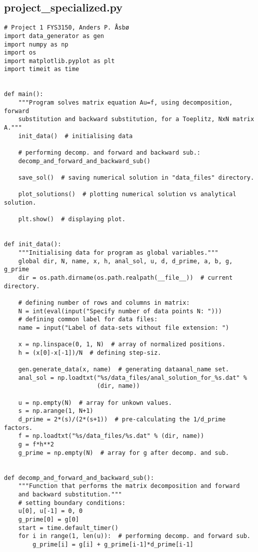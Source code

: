 \documentclass[english,notitlepage]{revtex4-1}  %
\begin{document}
\subsection{project\_specialized.py}\label{A:12}
\begin{lstlisting}
# Project 1 FYS3150, Anders P. Åsbø
import data_generator as gen
import numpy as np
import os
import matplotlib.pyplot as plt
import timeit as time


def main():
    """Program solves matrix equation Au=f, using decomposition, forward
    substitution and backward substitution, for a Toeplitz, NxN matrix A."""
    init_data()  # initialising data

    # performing decomp. and forward and backward sub.:
    decomp_and_forward_and_backward_sub()

    save_sol()  # saving numerical solution in "data_files" directory.

    plot_solutions()  # plotting numerical solution vs analytical solution.

    plt.show()  # displaying plot.


def init_data():
    """Initialising data for program as global variables."""
    global dir, N, name, x, h, anal_sol, u, d, d_prime, a, b, g, g_prime
    dir = os.path.dirname(os.path.realpath(__file__))  # current directory.

    # defining number of rows and columns in matrix:
    N = int(eval(input("Specify number of data points N: ")))
    # defining common label for data files:
    name = input("Label of data-sets without file extension: ")

    x = np.linspace(0, 1, N)  # array of normalized positions.
    h = (x[0]-x[-1])/N  # defining step-siz.

    gen.generate_data(x, name)  # generating dataanal_name set.
    anal_sol = np.loadtxt("%s/data_files/anal_solution_for_%s.dat" %
                          (dir, name))

    u = np.empty(N)  # array for unkown values.
    s = np.arange(1, N+1)
    d_prime = 2*(s)/(2*(s+1))  # pre-calculating the 1/d_prime factors.
    f = np.loadtxt("%s/data_files/%s.dat" % (dir, name))
    g = f*h**2
    g_prime = np.empty(N)  # array for g after decomp. and sub.


def decomp_and_forward_and_backward_sub():
    """Function that performs the matrix decomposition and forward
    and backward substitution."""
    # setting boundary conditions:
    u[0], u[-1] = 0, 0
    g_prime[0] = g[0]
    start = time.default_timer()
    for i in range(1, len(u)):  # performing decomp. and forward sub.
        g_prime[i] = g[i] + g_prime[i-1]*d_prime[i-1]


\end{lstlisting}
\end{document}
